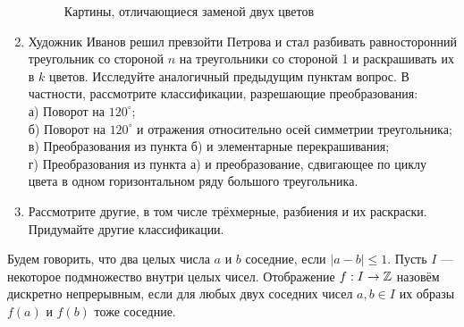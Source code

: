 \begin{enumerate}
\begin{figure}[h]
\begin{center}
\end{center}
\caption{Картины, отличающиеся заменой двух цветов}
\end{figure}
\item Художник Иванов решил превзойти Петрова и стал разбивать равносторонний треугольник со стороной $n$ на треугольники со стороной 1 и раскрашивать их в $k$ цветов. Исследуйте аналогичный предыдущим пунктам вопрос. В частности, рассмотрите классификации, разрешающие преобразования: \\
а) Поворот на $120^{\circ}$;\\
б) Поворот на $120^{\circ}$ и отражения относительно осей симметрии треугольника;\\
в) Преобразования из пункта б) и элементарные перекрашивания;\\
г) Преобразования из пункта а) и преобразование, сдвигающее по циклу цвета в одном горизонтальном ряду большого треугольника.
\item Рассмотрите другие, в том числе трёхмерные, разбиения и их раскраски. Придумайте другие классификации.

\end{enumerate}



 Будем говорить, что два целых числа $a$ и $b$ соседние, если $|a-b|\leq 1$. Пусть $I$ --- некоторое подмножество внутри целых чисел. Отображение $f:I\to \mathbb{Z}$ назовём дискретно непрерывным, если для любых двух соседних чисел $a,b\in I$ их образы $f(a)$ и $f(b)$ тоже соседние. 

